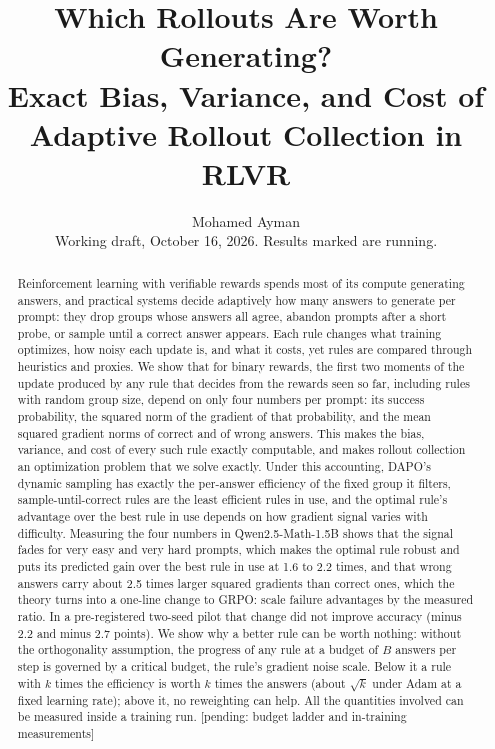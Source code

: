 \documentclass[11pt]{article}
\title{\textbf{Which Rollouts Are Worth Generating?}\\[4pt]
\large Exact Bias, Variance, and Cost of Adaptive Rollout Collection in RLVR}
\author{Mohamed Ayman\\\small Working draft, October 16, 2026. Results marked \pending{} are running.}
\date{}
\newcommand{\pending}[1]{\textcolor{red!60!black}{[pending: #1]}}
\begin{document}
\maketitle

\begin{abstract}
Reinforcement learning with verifiable rewards spends most of its compute generating answers, and practical systems decide adaptively how many answers to generate per prompt: they drop groups whose answers all agree, abandon prompts after a short probe, or sample until a correct answer appears. Each rule changes what training optimizes, how noisy each update is, and what it costs, yet rules are compared through heuristics and proxies. We show that for binary rewards, the first two moments of the update produced by any rule that decides from the rewards seen so far, including rules with random group size, depend on only four numbers per prompt: its success probability, the squared norm of the gradient of that probability, and the mean squared gradient norms of correct and of wrong answers. This makes the bias, variance, and cost of every such rule exactly computable, and makes rollout collection an optimization problem that we solve exactly. Under this accounting, DAPO's dynamic sampling has exactly the per-answer efficiency of the fixed group it filters, sample-until-correct rules are the least efficient rules in use, and the optimal rule's advantage over the best rule in use depends on how gradient signal varies with difficulty. Measuring the four numbers in Qwen2.5-Math-1.5B shows that the signal fades for very easy and very hard prompts, which makes the optimal rule robust and puts its predicted gain over the best rule in use at 1.6 to 2.2 times, and that wrong answers carry about 2.5 times larger squared gradients than correct ones, which the theory turns into a one-line change to GRPO: scale failure advantages by the measured ratio. In a pre-registered two-seed pilot that change did not improve accuracy (minus 2.2 and minus 2.7 points). We show why a better rule can be worth nothing: without the orthogonality assumption, the progress of any rule at a budget of $B$ answers per step is governed by a critical budget, the rule's gradient noise scale. Below it a rule with $k$ times the efficiency is worth $k$ times the answers (about $\sqrt k$ under Adam at a fixed learning rate); above it, no reweighting can help. All the quantities involved can be measured inside a training run. \pending{budget ladder and in-training measurements}
\end{abstract}
\end{document}

